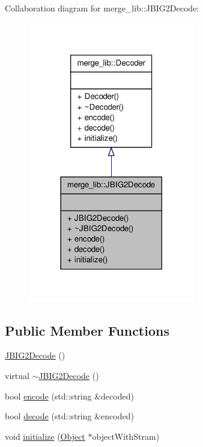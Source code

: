 Collaboration diagram for merge\-\_\-lib\-:\-:J\-B\-I\-G2\-Decode\-:
\nopagebreak
\begin{figure}[H]
\begin{center}
\leavevmode
\includegraphics[width=206pt]{dd/ddc/classmerge__lib_1_1_j_b_i_g2_decode__coll__graph}
\end{center}
\end{figure}
\subsection*{Public Member Functions}
\begin{DoxyCompactItemize}
\item 
\hyperlink{classmerge__lib_1_1_j_b_i_g2_decode_a60234d07c41c587c4b791b0f94d7f398}{J\-B\-I\-G2\-Decode} ()
\item 
virtual \hyperlink{classmerge__lib_1_1_j_b_i_g2_decode_a35473c54aff27a8bd2c5e84c92a6631a}{$\sim$\-J\-B\-I\-G2\-Decode} ()
\item 
bool \hyperlink{classmerge__lib_1_1_j_b_i_g2_decode_ab974a9a98770183a0d7d7c72ec604b83}{encode} (std\-::string \&decoded)
\item 
bool \hyperlink{classmerge__lib_1_1_j_b_i_g2_decode_a075509ec616dd9a01477fdd413de1a5c}{decode} (std\-::string \&encoded)
\item 
void \hyperlink{classmerge__lib_1_1_j_b_i_g2_decode_a2b89ab8cde5c815035271b097b581530}{initialize} (\hyperlink{classmerge__lib_1_1_object}{Object} $\ast$object\-With\-Stram)
\end{DoxyCompactItemize}


